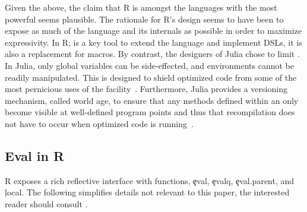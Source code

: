 \documentclass[review,screen,acmsmall,anonymous=true]{acmart}
\begin{document}
Given the above, the claim that R is amongst the languages with the most
powerful \eval seems plausible. The rationale for R's design seems to have been
to expose as much of the language and its internals as possible in order to
maximize expressivity. In R; \eval is a key tool to extend the language and
implement DSLs, it is also a replacement for macros. By contrast, the designers
of Julia chose to limit \eval. In Julia, only global variables can be
side-effected, and environments cannot be readily manipulated. This is designed
to shield optimized code from some of the most pernicious uses of the
facility~\cite{oopsla18a}. Furthermore, Julia provides a versioning
mechanism, called world age, to ensure that any methods defined within an \eval
only become visible at well-defined program points and thus that recompilation
does not have to occur when optimized code is running~\cite{oopsla20a}.

\subsection{Eval in R}\label{sec:eval-in-r}

R exposes a rich reflective interface with functions, \c{eval},
\c{evalq}, \c{eval.parent}, and \c{local}. The following simplifies details not
relevant to this paper, the interested reader should consult \citet{hadley}.
\end{document}
